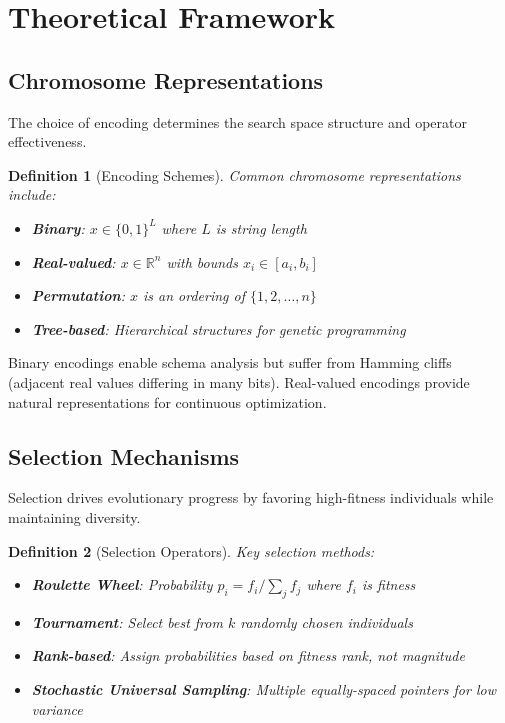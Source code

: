 \documentclass[a4paper, 11pt]{article}
\newtheorem{definition}{Definition}[section]
\begin{document}
\section{Theoretical Framework}

\subsection{Chromosome Representations}

The choice of encoding determines the search space structure and operator effectiveness.

\begin{definition}[Encoding Schemes]
Common chromosome representations include:
\begin{itemize}
\item \textbf{Binary}: $x \in \{0,1\}^L$ where $L$ is string length
\item \textbf{Real-valued}: $x \in \mathbb{R}^n$ with bounds $x_i \in [a_i, b_i]$
\item \textbf{Permutation}: $x$ is an ordering of $\{1, 2, \ldots, n\}$
\item \textbf{Tree-based}: Hierarchical structures for genetic programming
\end{itemize}
\end{definition}

Binary encodings enable schema analysis but suffer from Hamming cliffs (adjacent real values differing in many bits). Real-valued encodings provide natural representations for continuous optimization.

\subsection{Selection Mechanisms}

Selection drives evolutionary progress by favoring high-fitness individuals while maintaining diversity.

\begin{definition}[Selection Operators]
Key selection methods:
\begin{itemize}
\item \textbf{Roulette Wheel}: Probability $p_i = f_i / \sum_j f_j$ where $f_i$ is fitness
\item \textbf{Tournament}: Select best from $k$ randomly chosen individuals
\item \textbf{Rank-based}: Assign probabilities based on fitness rank, not magnitude
\item \textbf{Stochastic Universal Sampling}: Multiple equally-spaced pointers for low variance
\end{itemize}
\end{definition}
\end{document}

